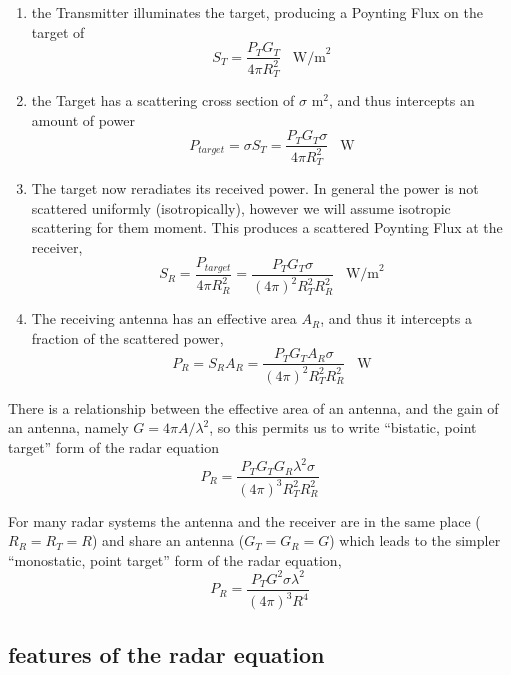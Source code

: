 \begin{enumerate}
\item the Transmitter illuminates the target, producing a Poynting
  Flux on the target of 
\begin{displaymath}
S_T = \frac{P_T G_T}{4\pi R_T^2} \;\;\; \textrm{W/m}^2
\end{displaymath}
\item the Target has a scattering cross section of $\sigma$ m$^2$, and
  thus intercepts an amount of power
\begin{displaymath}
P_{target} = \sigma S_T = \frac{P_T G_T \sigma}{4\pi R_T^2} \;\;\;
\textrm{W}
\end{displaymath}
\item The target now reradiates its received power.  In general the power is not scattered uniformly (isotropically), however we will assume isotropic scattering for them moment.  This produces a scattered Poynting Flux at the receiver,
\begin{displaymath}
S_R = \frac{P_{target}}{4\pi R_R^2} = \frac{P_T G_T \sigma}{(4\pi)^2
  R_T^2 R_R^2} \;\;\; \textrm{W/m}^2
\end{displaymath}
\item The receiving antenna has an effective area $A_R$, and thus it
  intercepts a fraction of the scattered power,
\begin{displaymath}
P_R = S_R A_R =  \frac{P_T G_T A_R \sigma}{(4\pi)^2 R_T^2 R_R^2}
\;\;\; \textrm{W}
\end{displaymath}
\end{enumerate}

There is a relationship between the effective area of an antenna, and
the gain of an antenna, namely $G = 4\pi A/\lambda^2$, so this permits
us to write ``bistatic, point target'' form of the radar equation
\begin{equation}
P_R = \frac{P_T G_T G_R \lambda^2 \sigma}{(4\pi)^3 R_T^2 R_R^2}
\end{equation}

For many radar systems the antenna and the receiver are in the same
place ($R_R = R_T = R$) and share an antenna ($G_T = G_R = G$) which
leads to the simpler ``monostatic, point target'' form of the radar
equation,
\begin{equation}
P_R = \frac{P_T G^2 \sigma \lambda^2}{(4\pi)^3 R^4}
\end{equation}

\subsection{features of the radar equation}

